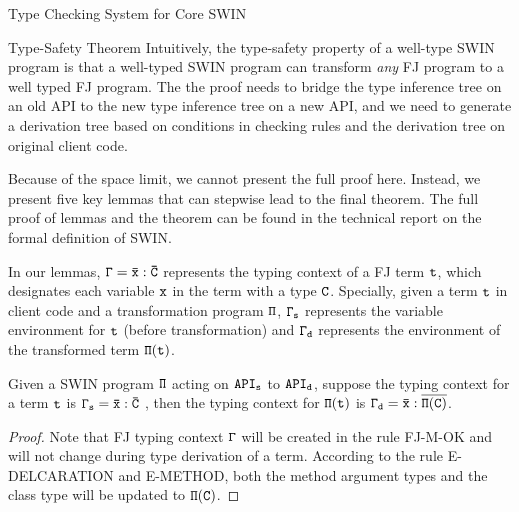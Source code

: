 \begin{section}{Type Checking System for Core SWIN}
\begin{subsection}{Type-Safety Theorem}
Intuitively, the type-safety property of a well-type SWIN program is that a well-typed SWIN program can transform \emph{any} FJ program to a well typed FJ program. The the proof needs to bridge the type inference tree on an old
API to the new type inference tree on a new API, and we need to generate
a derivation tree based on conditions in checking rules and the
derivation tree on original client code.

Because of the space limit, we cannot present the full proof
here. Instead, we present five key lemmas that can stepwise lead to
the final theorem. The full proof of lemmas and the theorem
can be found in  the technical report on the formal definition of SWIN. 

In our lemmas, $\tt\Gamma=\bar{x}:\bar{C}$ represents the typing context of a FJ term $\tt t$, which designates each variable $\tt x$ in the term with a type $\tt C$.  Specially, given a term $\tt t$ in client code and a transformation program $\tt\Pi$, $\tt\Gamma_s$ represents the variable environment for $\tt t$ (before transformation) and $\tt\Gamma_d$ represents the environment of the transformed term $\tt\Pi(t)$.


\begin{lemma}
Given a SWIN program $\tt\Pi$ acting on $\tt API_s$ to $\tt API_d$, suppose the typing context for a term $\tt t$ is $\tt\Gamma_s = \bar{x}:\bar{C}$ , then the typing context for $\tt\Pi(t)$ is $\tt\Gamma_d=\bar{x}:\overline{\Pi(C)}$.
\end{lemma}
\begin{proof}
Note that FJ typing context $\tt\Gamma$ will be created in the rule FJ-M-OK and will not change during type derivation of a term. According to the rule E-DELCARATION and E-METHOD, both the method argument types and the class type will be updated to $\tt\Pi(C)$.
\end{proof}


\end{subsection}
\end{section}
